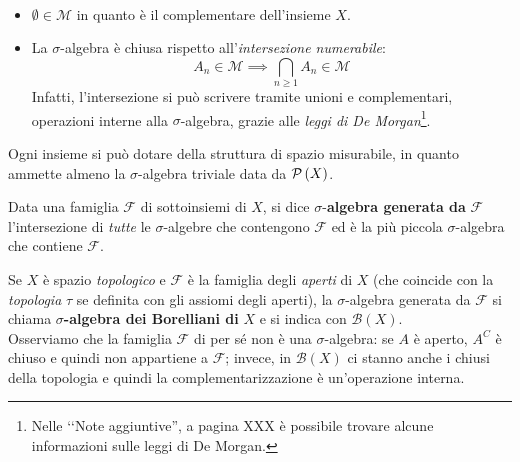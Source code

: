 \begin{observe}~{}
	\begin{itemize}
		\item $\emptyset\in\mathcal{M}$ in quanto è il complementare dell'insieme $X$.
		\item La $\sigma$-algebra è chiusa rispetto all'\textit{intersezione numerabile}:
		\begin{equation*}
			A_n\in\mathcal{M}\implies \bigcap_{n\geq 1}A_n\in\mathcal{M} 
		\end{equation*}
		Infatti, l'intersezione si può scrivere tramite unioni e complementari, operazioni interne alla $\sigma$-algebra, grazie alle \textit{leggi di De Morgan}\footnote{Nelle ‘‘Note aggiuntive'', a pagina XXX è possibile trovare alcune informazioni sulle leggi di De Morgan.}.
	\end{itemize}
\end{observe}
\begin{example}
	Ogni insieme si può dotare della struttura di spazio misurabile, in quanto ammette almeno la $\sigma$-algebra triviale data da $\mathcal{P}\left(X\right)$.
\end{example}
\begin{define}
	Data una famiglia $\mathcal{F}$ di sottoinsiemi di $X$, si dice $\sigma$-\textbf{algebra generata da} $\mathcal{F}$ l'intersezione di \textit{tutte} le $\sigma$-algebre che contengono $\mathcal{F}$ ed è la più piccola $\sigma$-algebra che contiene $\mathcal{F}$.
\end{define}
\begin{example}
	Se $X$ è spazio \textit{topologico} e $\mathcal{F}$ è la famiglia degli \textit{aperti} di $X$ (che coincide con la \textit{topologia} $\tau$ se definita con gli assiomi degli aperti), la $\sigma$-algebra generata da $\mathcal{F}$ si chiama $\sigma$\textbf{-algebra dei Borelliani di} $X$ e si indica con $\mathcal{B}\left(X\right)$.\\
	Osserviamo che la famiglia $\mathcal{F}$ di per sé non è una $\sigma$-algebra: se $A$ è aperto, $A^C$ è chiuso e quindi non appartiene a $\mathcal{F}$; invece, in $\mathcal{B}\left(X\right)$ ci stanno anche i chiusi della topologia e quindi la complementarizzazione è un'operazione interna.
\end{example}
